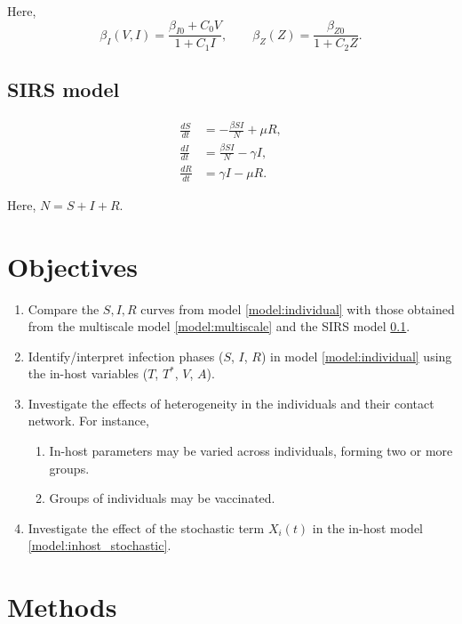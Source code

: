\documentclass[11pt]{article}
\numberwithin{equation}{subsection}
\begin{document}
    Here, \[
        \beta_I(V, I) = \frac{\beta_{I0} + C_0 V}{1 + C_1 I}, \qquad
        \beta_Z(Z) = \frac{\beta_{Z0}}{1 + C_2 Z}.
    \]


    \subsection{SIRS model} \label{model:SIRS}

    \begin{align}
        \frac{dS}{dt} &= -\frac{\beta SI}{N} + \mu R, \\
        \frac{dI}{dt} &= \frac{\beta SI}{N} - \gamma I, \\
        \frac{dR}{dt} &= \gamma I - \mu R.
    \end{align}

    Here, $N = S + I + R$.


    \section{Objectives}

    \begin{enumerate}
        \item Compare the $S, I, R$ curves from model \ref{model:individual}
        with those obtained from the multiscale model \ref{model:multiscale}
        and the SIRS model \ref{model:SIRS}.

        \item Identify/interpret infection phases ($S$, $I$, $R$) in model
        \ref{model:individual} using the in-host variables ($T$, $T^*$, $V$,
        $A$).

        \item Investigate the effects of heterogeneity in the individuals and
        their contact network. For instance,
        \begin{enumerate}
            \item In-host parameters may be varied across individuals, forming
            two or more groups.
            \item Groups of individuals may be vaccinated.
        \end{enumerate}

        \item Investigate the effect of the stochastic term $X_i(t)$ in the
        in-host model \ref{model:inhost_stochastic}.
    \end{enumerate}


    \section{Methods}
\end{document}
